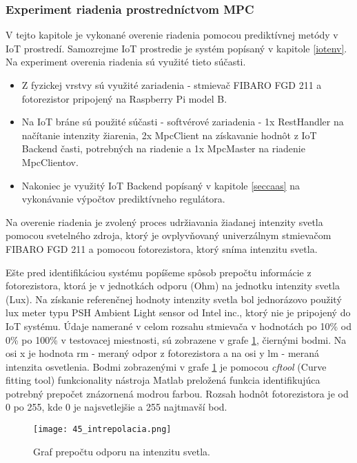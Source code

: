 \subsubsection{Experiment riadenia prostredníctvom MPC}
V tejto kapitole je vykonané overenie riadenia pomocou prediktívnej metódy v IoT prostredí. Samozrejme IoT prostredie je systém popísaný v kapitole \ref{iotenv}. Na experiment overenia riadenia sú využité tieto súčasti.
\begin{itemize}
\item Z fyzickej vrstvy sú využité zariadenia - stmievač FIBARO FGD 211 a fotorezistor pripojený na Raspberry Pi model B.
\item Na IoT bráne sú použité súčasti - softvérové zariadenia - 1x RestHandler na načítanie intenzity žiarenia, 2x MpcClient na získavanie hodnôt z IoT Backend časti, potrebných na riadenie a 1x MpcMaster na riadenie MpcClientov. 
\item Nakoniec je využitý IoT Backend popísaný v kapitole \ref{seccaas} na vykonávanie výpočtov prediktívneho regulátora.
\end{itemize}
Na overenie riadenia je zvolený proces udržiavania žiadanej intenzity svetla  pomocou svetelného zdroja, ktorý je ovplyvňovaný univerzálnym stmievačom FIBARO FGD 211 a pomocou fotorezistora, ktorý sníma intenzitu svetla.

\indent Ešte pred identifikáciou systému popíšeme spôsob prepočtu informácie z fotorezistora, ktorá je v jednotkách odporu (Ohm) na jednotku intenzity svetla (Lux). Na získanie referenčnej hodnoty intenzity svetla bol jednorázovo použitý lux meter typu PSH Ambient Light sensor od Intel inc., ktorý nie je pripojený do IoT systému. Údaje namerané v celom rozsahu stmievača v hodnotách po 10\% od 0\% po 100\% v testovacej miestnosti, sú zobrazene v grafe \ref{45_intrepolacia}, čiernými bodmi. Na osi x je hodnota rm - meraný odpor z fotorezistora a na osi y lm - meraná intenzita osvetlenia. Bodmi zobrazenými v grafe \ref{45_intrepolacia} je pomocou \textit{cftool} (Curve fitting tool) funkcionality nástroja Matlab preložená funkcia identifikujúca potrebný prepočet znázornená modrou farbou. Rozsah hodnôt fotorezistora je od 0 po 255, kde 0 je najsvetlejšie a 255 najtmavší bod.
\begin{figure}[!htbp]
\centering
\texttt{[image: 45\_intrepolacia.png]}
\caption{Graf prepočtu odporu na intenzitu svetla.}
\label{45_intrepolacia}
\end{figure}

